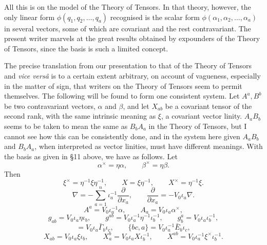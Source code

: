\documentclass[11pt]{article}
\begin{document}
\indent All this is on the model of the Theory of Tensors. In that theory, however, the only linear form $\phi(q_1,q_2,\ldots,q_a)$ recognised is the scalar form $\phi(\alpha_1,\alpha_2,\ldots,\alpha_a)$ in several vectors, some of which are covariant and the rest contravariant. The present writer marvels at the great results obtained by expounders of the Theory of Tensors, since the basis is such a limited concept.

\indent The precise translation from our presentation to that of the Theory of Tensors and \emph{vice vers\^a} is to a certain extent arbitrary, on account of vagueness, especially in the matter of sign, that writers on the Theory of Tensors seem to permit themselves. The following will be found to form one consistent system. Let $A^a,B^b$ be two contravariant vectors, $\alpha$ and $\beta$, and let $X_{ab}$ be a covariant tensor of the second rank, with the same intrinsic meaning as $\xi$, a covariant vector linity. $A_aB_b$ seems to be taken to mean the same as $B_bA_a$ in the Theory of Tensors, but I cannot see how this can be consistently done, and in the system here given $A_aB_b$ and $B_bA_a$, when interpreted as vector linities, must have different meanings.
With the basis as given in \S11 above, we have as follows. Let
\begin{equation}\alpha^\times=\eta\alpha,\qquad \beta^\times=\eta\beta.\tag{1}\end{equation}
Then
\begin{equation}\xi^\times=\eta^{-1}\xi\eta^{-1},\qquad X=\xi\eta^{-1},\qquad X^\times=\eta^{-1}\xi.\tag{2}\end{equation}
\begin{equation}\nabla=-\sum_{a=1}^n\iota_a^{-1}\frac{\partial}{\partial x_a},\qquad \frac{\partial}{\partial x_a}=-V_0\iota_a\nabla.\tag{3}\end{equation}
\begin{equation}A^a=V_0\iota_a^{-1}\alpha,\qquad A_a=V_0\iota_a\alpha^\times,\tag{4}\end{equation}
\begin{equation}g_{ab}=V_0\iota_a\eta\iota_b,\qquad g^{ab}=V_0\iota_a^{-1}\eta^{-1}\iota_b^{-1},\qquad g_b^a=V_0\iota_a\iota_b^{-1},\tag{5}\end{equation}
\begin{equation}[bc,a]=V_0\iota_a\bar\Gamma_b\iota_c,\qquad \{bc,a\}=V_0\iota_a^{-1}\bar E_b\iota_c,\tag{6}\end{equation}
\begin{equation}X_{ab}=V_0\iota_a\xi\iota_b,\qquad X_a^b=V_0\iota_aX\iota_b^{-1},\qquad X^{ab}=V_0\iota_a^{-1}\xi^\times\iota_b^{-1}.\tag{7}\end{equation}
\end{document}
